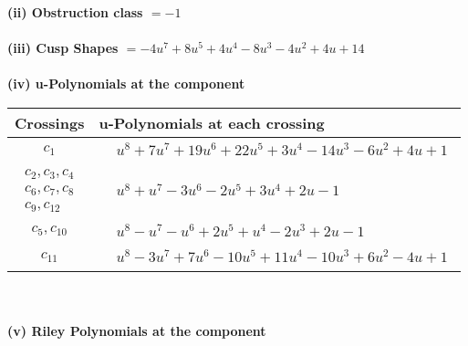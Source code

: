\documentclass[1p]{elsarticle_modified}
\theoremstyle{definition}
\begin{document}
\flushleft \textbf{(ii) Obstruction class $= -1$}\\~\\
\flushleft \textbf{(iii) Cusp Shapes $= -4 u^7+8 u^5+4 u^4-8 u^3-4 u^2+4 u+14$}\\~\\
\newpage\renewcommand{\arraystretch}{1}
\flushleft \textbf{(iv) u-Polynomials at the component}\newline \\
\begin{tabular}{m{50pt}|m{274pt}}
Crossings & \hspace{64pt}u-Polynomials at each crossing \\
\hline $$\begin{aligned}c_{1}\end{aligned}$$&$\begin{aligned}
&u^8+7 u^7+19 u^6+22 u^5+3 u^4-14 u^3-6 u^2+4 u+1
\end{aligned}$\\
\hline $$\begin{aligned}c_{2},c_{3},c_{4}\\c_{6},c_{7},c_{8}\\c_{9},c_{12}\end{aligned}$$&$\begin{aligned}
&u^8+u^7-3 u^6-2 u^5+3 u^4+2 u-1
\end{aligned}$\\
\hline $$\begin{aligned}c_{5},c_{10}\end{aligned}$$&$\begin{aligned}
&u^8- u^7- u^6+2 u^5+u^4-2 u^3+2 u-1
\end{aligned}$\\
\hline $$\begin{aligned}c_{11}\end{aligned}$$&$\begin{aligned}
&u^8-3 u^7+7 u^6-10 u^5+11 u^4-10 u^3+6 u^2-4 u+1
\end{aligned}$\\
\hline
\end{tabular}\\~\\
\newpage\renewcommand{\arraystretch}{1}
\flushleft \textbf{(v) Riley Polynomials at the component}\newline \\
\end{document}
